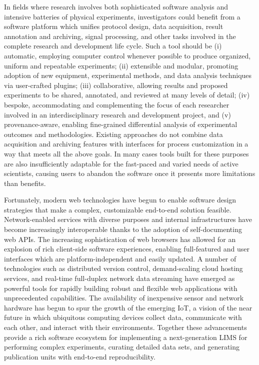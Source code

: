 \documentclass[../thesis]{subfiles}
\begin{document}
In fields where research involves both sophisticated software analysis
and intensive batteries of physical experiments, investigators could
benefit from a software platform which unifies protocol design, data
acquisition, result annotation and archiving, signal processing, and
other tasks involved in the complete research and development life
cycle. Such a tool should be (i) automatic, employing computer control
whenever possible to produce organized, uniform and repeatable
experiments; (ii) extensible and modular, promoting adoption of new
equipment, experimental methods, and data analysis techniques via
user-crafted plugins; (iii) collaborative, allowing results and
proposed experiments to be shared, annotated, and reviewed at many
levels of detail; (iv) bespoke, accommodating and complementing the
focus of each researcher involved in an interdisciplinary research and
development project, and (v) provenance-aware, enabling fine-grained
differential analysis of experimental outcomes and
methodologies. Existing approaches do not combine data acquisition and
archiving features with interfaces for process customization in a way
that meets all the above goals. In many cases tools built for
these purposes are also insufficiently adaptable for the fast-paced
and varied needs of active scientists, causing users to abandon the
software once it presents more limitations than benefits.

Fortunately, modern web technologies have begun to enable software
design strategies that make a complex, customizable end-to-end
solution feasible. Network-enabled services with diverse purposes and
internal infrastructures have become increasingly interoperable thanks
to the adoption of self-documenting web \glspl{API}. The increasing
sophistication of web browsers has allowed for an explosion of rich
client-side software experiences, enabling full-featured and user
interfaces which are platform-independent and easily updated. A number
of technologies such as distributed version control, demand-scaling
cloud hosting services, and real-time full-duplex network data
streaming have emerged as powerful tools for rapidly building robust
and flexible web applications with unprecedented capabilities. The
availability of inexpensive sensor and network hardware has begun to
spur the growth of the emerging \gls{IoT}, a vision of the near future
in which ubiquitous computing devices collect data, communicate with
each other, and interact with their environments.  Together these
advancements provide a rich software ecosystem for implementing a
next-generation \gls{LIMS} for performing complex experiments,
curating detailed data sets, and generating publication units with
end-to-end reproducibility.
\end{document}
